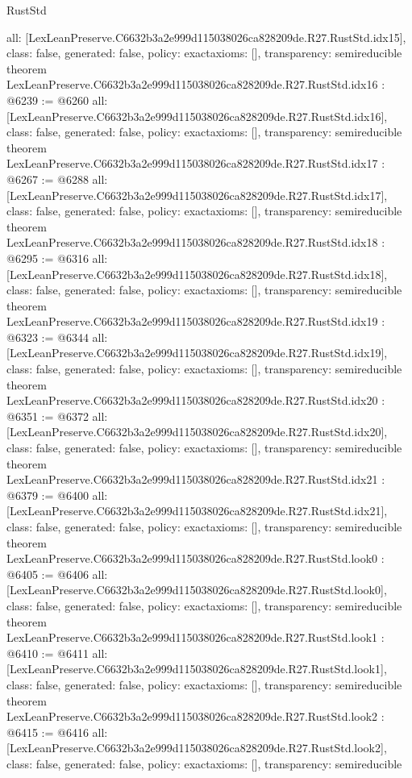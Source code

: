 \begin{lexlean}{RustStd}
\begin{coremodule}
{  all: [LexLeanPreserve.C6632b3a2e999d115038026ca828209de.R27.RustStd.idx15],
  class: false,
  generated: false,
  policy: exact{axioms: []},
  transparency: semireducible
}
theorem LexLeanPreserve.C6632b3a2e999d115038026ca828209de.R27.RustStd.idx16 : @6239 := @6260 {
  all: [LexLeanPreserve.C6632b3a2e999d115038026ca828209de.R27.RustStd.idx16],
  class: false,
  generated: false,
  policy: exact{axioms: []},
  transparency: semireducible
}
theorem LexLeanPreserve.C6632b3a2e999d115038026ca828209de.R27.RustStd.idx17 : @6267 := @6288 {
  all: [LexLeanPreserve.C6632b3a2e999d115038026ca828209de.R27.RustStd.idx17],
  class: false,
  generated: false,
  policy: exact{axioms: []},
  transparency: semireducible
}
theorem LexLeanPreserve.C6632b3a2e999d115038026ca828209de.R27.RustStd.idx18 : @6295 := @6316 {
  all: [LexLeanPreserve.C6632b3a2e999d115038026ca828209de.R27.RustStd.idx18],
  class: false,
  generated: false,
  policy: exact{axioms: []},
  transparency: semireducible
}
theorem LexLeanPreserve.C6632b3a2e999d115038026ca828209de.R27.RustStd.idx19 : @6323 := @6344 {
  all: [LexLeanPreserve.C6632b3a2e999d115038026ca828209de.R27.RustStd.idx19],
  class: false,
  generated: false,
  policy: exact{axioms: []},
  transparency: semireducible
}
theorem LexLeanPreserve.C6632b3a2e999d115038026ca828209de.R27.RustStd.idx20 : @6351 := @6372 {
  all: [LexLeanPreserve.C6632b3a2e999d115038026ca828209de.R27.RustStd.idx20],
  class: false,
  generated: false,
  policy: exact{axioms: []},
  transparency: semireducible
}
theorem LexLeanPreserve.C6632b3a2e999d115038026ca828209de.R27.RustStd.idx21 : @6379 := @6400 {
  all: [LexLeanPreserve.C6632b3a2e999d115038026ca828209de.R27.RustStd.idx21],
  class: false,
  generated: false,
  policy: exact{axioms: []},
  transparency: semireducible
}
theorem LexLeanPreserve.C6632b3a2e999d115038026ca828209de.R27.RustStd.look0 : @6405 := @6406 {
  all: [LexLeanPreserve.C6632b3a2e999d115038026ca828209de.R27.RustStd.look0],
  class: false,
  generated: false,
  policy: exact{axioms: []},
  transparency: semireducible
}
theorem LexLeanPreserve.C6632b3a2e999d115038026ca828209de.R27.RustStd.look1 : @6410 := @6411 {
  all: [LexLeanPreserve.C6632b3a2e999d115038026ca828209de.R27.RustStd.look1],
  class: false,
  generated: false,
  policy: exact{axioms: []},
  transparency: semireducible
}
theorem LexLeanPreserve.C6632b3a2e999d115038026ca828209de.R27.RustStd.look2 : @6415 := @6416 {
  all: [LexLeanPreserve.C6632b3a2e999d115038026ca828209de.R27.RustStd.look2],
  class: false,
  generated: false,
  policy: exact{axioms: []},
  transparency: semireducible
}
\end{coremodule}
\end{lexlean}
